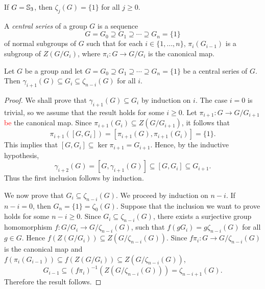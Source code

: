 \begin{example}
	If $G=\mathbb{S}_3$, then $\zeta_j(G)=\{1\}$ for all $j\geq 0$.
	\end{example}

A {\em central series} of a group $G$ is a sequence
\[
	G=G_0\supseteq G_1\supseteq\cdots\supseteq G_n=\{1\}
\]
of normal subgroups of $G$ such that for each $i\in\{1,\dots,n\}$, 
$\pi_i(G_{i-1})$ is a subgroup of $Z(G/G_i)$, where $\pi_i\colon G\to
G/G_i$ is the canonical map. 

\begin{proposition}
	\label{pro:serie_central}
	Let $G$ be a group and let $G=G_0\supseteq G_1\supseteq\cdots\supseteq G_n=\{1\}$
	be a central series of $G$. Then $\gamma_{i+1}(G)\subseteq G_i\subseteq \zeta_{n-i}(G)$ for all $i$.
\end{proposition}

\begin{proof}
    We shall prove that $\gamma_{i+1}(G)\subseteq G_i$ by induction on $i$. 
	The case $i=0$ is trivial, so we assume that 
	the result holds for some 
	$i\geq 0$. 
	Let $\pi_{i+1}\colon G\to G/G_{i+1}$ \textcolor{red}{be} the canonical map. 
	Since $\pi_{i+1}(G_{i})\subseteq Z(G/G_{i+1})$, it follows that
	\[
	\pi_{i+1}([G,G_{i}])=[\pi_{i+1}(G),\pi_{i+1}(G_{i})]=\{1\}.
	\]
	This implies that $[G,G_{i}]\subseteq\ker\pi_{i+1}=G_{i+1}$. Hence, by the inductive hypothesis,
	\[
	\gamma_{i+2}(G)=[G,\gamma_{i+1}(G)]\subseteq [G,G_{i}]\subseteq G_{i+1}. 
	\] Thus the first inclusion follows by induction.
	
	We now prove that $G_i\subseteq \zeta_{n-i}(G)$. We proceed by induction on $n-i$. If $n-i=0$, then $G_n=\{ 1\}=\zeta_0(G)$. Suppose that the
	inclusion we want to prove holds for some $n-i\geq 0$. Since $G_i\subseteq \zeta_{n-i}(G)$, there exists a surjective group homomorphism
	$f\colon G/G_i\rightarrow G/\zeta_{n-i}(G)$, such that $f(gG_i)=g\zeta_{n-i}(G)$ for all $g\in G$. 
	Hence $f(Z(G/G_i))\subseteq Z(G/\zeta_{n-i}(G))$. Since  $f\pi_i\colon G\rightarrow G/\zeta_{n-i}(G)$ is the canonical map and
	$f(\pi_i(G_{i-1}))\subseteq f(Z(G/G_i))\subseteq Z(G/\zeta_{n-i}(G))$, 
	\[
	G_{i-1}\subseteq (f\pi_i)^{-1}(Z(G/\zeta_{n-i}(G)))=\zeta_{n-i+1}(G).
	\]
	Therefore the result follows.
\end{proof}






